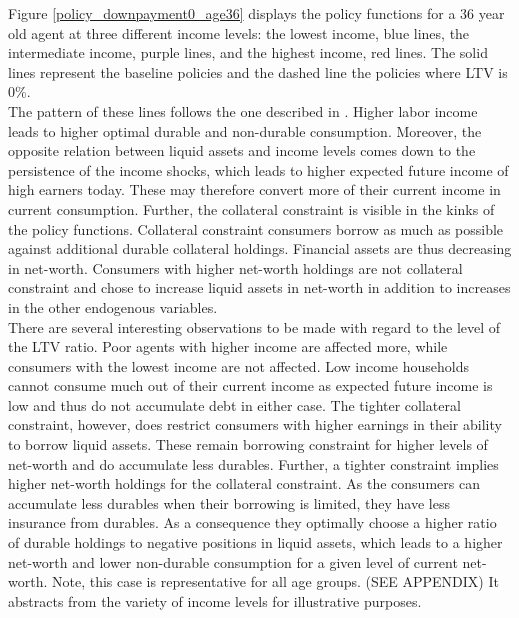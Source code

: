 \documentclass[a4paper,12pt,legno]{article}
\begin{document}
Figure \ref{policy_downpayment0_age36} displays the policy functions for a 36 year old agent at three different income levels: the lowest income, blue lines, the intermediate income, purple lines, and the highest income, red lines. The solid lines represent the baseline policies and the dashed line the policies where LTV is 0\%.\\ 
The pattern of these lines follows the one described in \cite{hintermaier2010}. Higher labor income leads to higher optimal durable and non-durable consumption. Moreover, the opposite   relation between liquid assets and income levels comes down to the persistence of the income shocks, which leads to higher expected future income of high earners today. These may therefore convert more of their current income in current consumption. Further, the collateral constraint is visible in the kinks of the policy functions. Collateral constraint consumers borrow as much as possible against additional durable collateral holdings. Financial assets are thus decreasing in net-worth. Consumers with higher net-worth holdings are not collateral constraint and chose to increase liquid assets in net-worth in addition to increases in the other endogenous variables. \\
There are several interesting observations to be made with regard to the level of the LTV ratio. Poor agents with higher income are affected more, while consumers with the lowest income are not affected.
Low income households cannot consume much out of their current income as expected future income is low and thus do not accumulate debt in either case. The tighter collateral constraint, however, does restrict consumers with higher earnings in their ability to borrow liquid assets. These remain borrowing constraint for higher levels of net-worth and do accumulate less durables. Further, a tighter constraint implies higher net-worth holdings for the collateral constraint. As the consumers can accumulate less durables when their borrowing is limited, they have less insurance from durables. As a consequence they optimally choose a higher ratio of durable holdings to negative positions in liquid assets, which leads to a higher net-worth and lower non-durable consumption for a given level of current net-worth.
Note, this case is representative for all age groups. (SEE APPENDIX) It abstracts from the variety of income levels for illustrative purposes.
\end{document}
